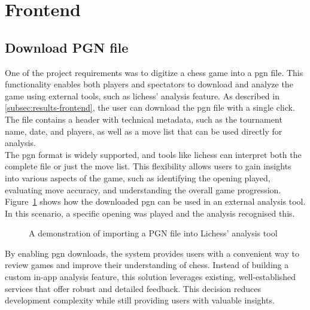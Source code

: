\section{Frontend}
\subsection{Download PGN file}
One of the project requirements was to digitize a chess game into a \gls{pgn} file. This functionality enables both players and spectators to download and analyze the game using external tools, such as \gls{lichess}’ analysis feature. As described in \ref{subsec:results-frontend}, the user can download the \gls{pgn} file with a single click. The file contains a header with technical metadata, such as the tournament name, date, and players, as well as a move list that can be used directly for analysis. \\

The \gls{pgn} format is widely supported, and tools like \gls{lichess} can interpret both the complete file or just the move list. This flexibility allows users to gain insights into various aspects of the game, such as identifying the opening played, evaluating move accuracy, and understanding the overall game progression. Figure~\ref{fig:downloaded-pgn-analysis} shows how the downloaded \gls{pgn} can be used in an external analysis tool. In this scenario, a specific opening was played and the analysis recognised this. \\

\begin{figure}[h!] \centering {}\caption[Lichess analysis tool]{A demonstration of importing a PGN file into Lichess' analysis tool}\label{fig:downloaded-pgn-analysis} \end{figure}

By enabling \gls{pgn} downloads, the system provides users with a convenient way to review games and improve their understanding of chess. Instead of building a custom in-app analysis feature, this solution leverages existing, well-established services that offer robust and detailed feedback. This decision reduces development complexity while still providing users with valuable insights. \\

